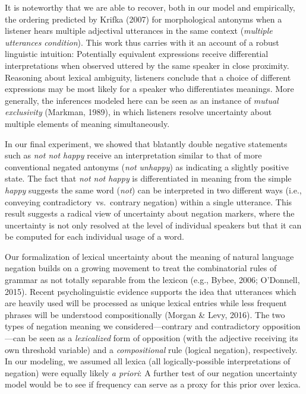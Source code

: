 \documentclass[floatsintext,doc]{apa6}
\begin{document}
It is noteworthy that we are able to recover, both in our model and empirically, the ordering predicted by Krifka (2007) for morphological antonyms when a listener hears multiple adjectival utterances in the same context (\emph{multiple utterances condition}).
This work thus carries with it an account of a robust linguistic intuition: Potentially equivalent expressions receive differential interpretations when observed uttered by the same speaker in close proximity.
Reasoning about lexical ambiguity, listeners conclude that a choice of different expressions may be most likely for a speaker who differentiates meanings.
More generally, the inferences modeled here can be seen as an instance of \emph{mutual exclusivity} (Markman, 1989), in which listeners resolve uncertainty about multiple elements of meaning simultaneously.

In our final experiment, we showed that blatantly double negative statements such as \emph{not not happy} receive an interpretation similar to that of more conventional negated antonyms (\emph{not unhappy}) as indicating a slightly positive state. 
The fact that \emph{not not happy} is differentiated in meaning from the simple \emph{happy} suggests the same word (\emph{not}) can be interpreted in two different ways (i.e., conveying contradictory~vs.~contrary negation) within a single utterance. 
This result suggests a radical view of uncertainty about negation markers, where the uncertainty is not only resolved at the level of individual speakers but that it can be computed for each individual usage of a word.

Our formalization of lexical uncertainty about the meaning of natural language negation builds on a growing movement to treat the combinatorial rules of grammar as not totally separable from the lexicon (e.g., Bybee, 2006; O'Donnell, 2015).
Recent psycholinguistic evidence supports the idea that utterances which are heavily used will be processed as unique lexical entries while less frequent phrases will be understood compositionally (Morgan \& Levy, 2016).
The two types of negation meaning we considered---contrary and contradictory opposition---can be seen as a \emph{lexicalized} form of opposition (with the adjective receiving its own threshold variable) and a \emph{compositional} rule (logical negation), respectively.
In our modeling, we assumed all lexica (all logically-possible interpretations of negation) were equally likely \emph{a priori}: A further test of our negation uncertainty model would be to see if frequency can serve as a proxy for this prior over lexica.
\end{document}
